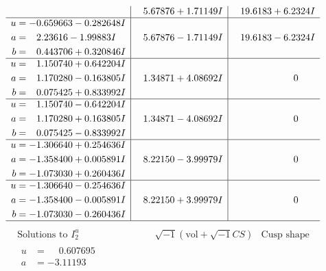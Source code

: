 \documentclass[1p]{elsarticle_modified}
\theoremstyle{definition}
\newcommand{\I}{\sqrt{-1}}
\begin{document}
$$\begin{array}{c|c|c}
 & \phantom{-}5.67876 + 1.71149 I & \phantom{-}19.6183 + 6.2324 I \\ \hline\begin{aligned}
u &= -0.659663 - 0.282648 I \\
a &= \phantom{-}2.23616 - 1.99883 I \\
b &= \phantom{-}0.443706 + 0.320846 I\end{aligned}
 & \phantom{-}5.67876 - 1.71149 I & \phantom{-}19.6183 - 6.2324 I \\ \hline\begin{aligned}
u &= \phantom{-}1.150740 + 0.642204 I \\
a &= \phantom{-}1.170280 - 0.163805 I \\
b &= \phantom{-}0.075425 + 0.833992 I\end{aligned}
 & \phantom{-}1.34871 + 4.08692 I & \phantom{-0.000000 } 0 \\ \hline\begin{aligned}
u &= \phantom{-}1.150740 - 0.642204 I \\
a &= \phantom{-}1.170280 + 0.163805 I \\
b &= \phantom{-}0.075425 - 0.833992 I\end{aligned}
 & \phantom{-}1.34871 - 4.08692 I & \phantom{-0.000000 } 0 \\ \hline\begin{aligned}
u &= -1.306640 + 0.254636 I \\
a &= -1.358400 + 0.005891 I \\
b &= -1.073030 + 0.260436 I\end{aligned}
 & \phantom{-}8.22150 - 3.99979 I & \phantom{-0.000000 } 0 \\ \hline\begin{aligned}
u &= -1.306640 - 0.254636 I \\
a &= -1.358400 - 0.005891 I \\
b &= -1.073030 - 0.260436 I\end{aligned}
 & \phantom{-}8.22150 + 3.99979 I & \phantom{-0.000000 } 0\\
 \hline 
 \end{array}$$\newpage$$\begin{array}{c|c|c}  
\text{Solutions to }I^u_{2}& \I (\text{vol} + \sqrt{-1}CS) & \text{Cusp shape}\\
 \hline 
\begin{aligned}
u &= \phantom{-}0.607695\phantom{ +0.000000I} \\
a &= -3.11193\phantom{ +0.000000I} \\

\end{aligned}
\end{array}$$
\end{document}
